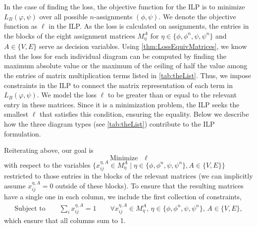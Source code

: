 In the case of finding the loss, the objective function for the ILP is to minimize $L_B(\varphi, \psi)$ over all possible $n$-assignments $(\phi,\psi)$. 
We denote the objective function as $\ell$ in the ILP.
As the loss is calculated on assignments, the entries in the blocks of the eight assignment matrices 
$M_\eta^A$ for $\eta \in \{ \phi, \phi^n, \psi, \psi^n\}$ and $A \in \{V, E\}$ serve as decision variables.
Using \cref{thm:LossEquivMatrices}, we know that the loss for each individual diagram can be computed by finding the maximum absolute value or the maximum of the ceiling of half the value among the entries of matrix multiplication terms listed in \cref{tab:theList}. 
Thus, we impose constraints in the ILP to connect the matrix representation of each term in $L_B(\varphi, \psi)$. 
We model the loss $\ell$ to be greater than or equal to the relevant entry in these matrices. 
Since it is a minimization problem, the ILP seeks the smallest $\ell$ that satisfies this condition, ensuring the equality.
Below we describe how the three diagram types (see \cref{tab:theList}) contribute to the ILP formulation. 
%

Reiterating above, our goal is 
\begin{equation*}
    \text{Minimize} \quad \ell 
\end{equation*}
with respect to the variables $ \{ x_{ij}^{\eta, A} \in M_\eta^A \mid  \eta \in \{ \phi, \phi^n, \psi, \psi^n\}, A \in \{V, E\} \}$ restricted to those entries in the blocks of the relevant matrices (we can implicitly assume $ x_{ij}^{\eta, A} = 0$ outside of these blocks). 
To ensure that the resulting matrices have a single one in each column, we include the first collection of constraints,
   \begin{align*}
        \text{Subject to}
        \qquad 
        \sum_i x_{ij}^{\eta,A} = 1 \qquad \forall x_{ij}^{\eta,A} \in M_\eta^A, \, \eta \in \{ \phi, \phi^n, \psi, \psi^n\}, \, A \in \{V,E\},
    \end{align*}
which ensure that all columns sum to 1. 


%
%
%
%
%
%
%
%
%
%
%
%
%
%
%
%
%
%



%
%

